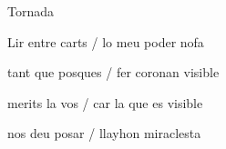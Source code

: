 \documentclass[12pt]{article}
\begin{document}
\begin{estrofaExtra}%




\begin{tornada}

\pagina{[72r]} Tornada

\end{tornada}


\end{estrofaExtra}


\begin{estrofa}

 Lir entre carts / lo meu poder nofa

 tant que posques / fer coronan visible

 merits la vos / car la que es visible

 nos deu posar / llayhon miraclesta

\end{estrofa}
\end{document}
